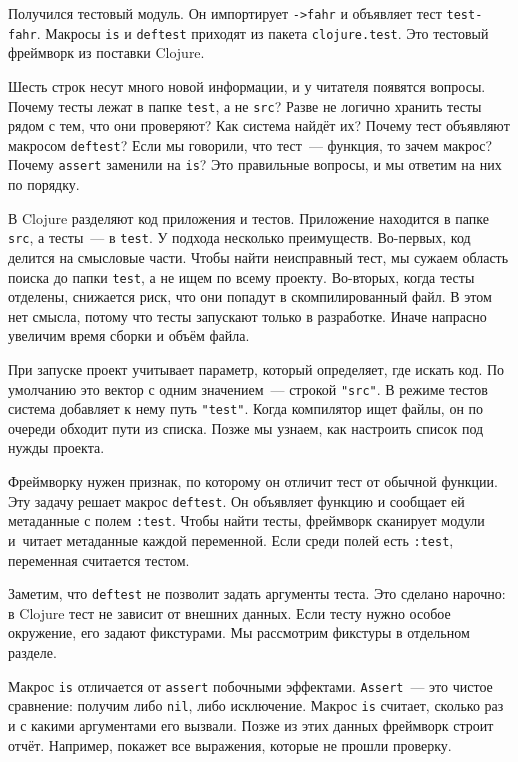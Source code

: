 \fi

Получился тестовый модуль. Он импортирует \verb|->fahr| и объявляет тест
\verb|test-fahr|. Макросы \verb|is| и \verb|deftest| приходят из пакета
\verb|clojure.test|. Это тестовый фреймворк из поставки Clojure.

Шесть строк несут много новой информации, и у читателя появятся вопросы. Почему
тесты лежат в папке \verb|test|, а не \verb|src|? Разве не логично хранить тесты
рядом с тем, что они проверяют? Как система найдёт их?  Почему тест объявляют
макросом \verb|deftest|? Если мы говорили, что тест~--- функция, то зачем
макрос? Почему \verb|assert| заменили на \verb|is|? Это правильные вопросы, и мы
ответим на них по порядку.

В Clojure разделяют код приложения и тестов. Приложение находится в папке
\verb|src|, а тесты~--- в \verb|test|. У подхода несколько
преимуществ. Во-первых, код делится на смысловые части. Чтобы найти неисправный
тест, мы сужаем область поиска до папки \verb|test|, а не ищем по всему
проекту. Во-вторых, когда тесты отделены, снижается риск, что они попадут в
скомпилированный файл. В этом нет смысла, потому что тесты запускают только в
разработке. Иначе напрасно увеличим время сборки и объём файла.

При запуске проект учитывает параметр, который определяет, где искать код. По
умолчанию это вектор с одним значением~--- строкой \verb|"src"|. В режиме тестов
система добавляет к нему путь \verb|"test"|. Когда компилятор ищет файлы, он по
очереди обходит пути из списка. Позже мы узнаем, как настроить список под нужды
проекта.


Фреймворку нужен признак, по которому он отличит тест от обычной функции. Эту
задачу решает макрос \verb|deftest|. Он объявляет функцию и сообщает ей
метаданные с полем \verb|:test|. Чтобы найти тесты, фреймворк сканирует модули
и~читает метаданные каждой переменной. Если среди полей есть \verb|:test|,
переменная считается тестом.

Заметим, что \verb|deftest| не позволит задать аргументы теста. Это сделано
нарочно: в Clojure тест не зависит от внешних данных. Если тесту нужно особое
окружение, его задают фикстурами. Мы рассмотрим фикстуры в отдельном разделе.

Макрос \verb|is| отличается от \verb|assert| побочными
эффектами. \verb|Assert|~--- это чистое сравнение: получим либо \verb|nil|, либо
исключение. Макрос \verb|is| считает, сколько раз и с какими аргументами его
вызвали. Позже из этих данных фреймворк строит отчёт. Например, покажет все
выражения, которые не прошли проверку.

